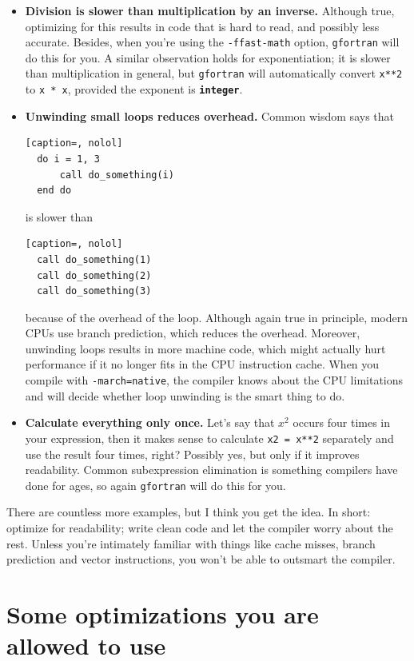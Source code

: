 \documentclass[openany,oneside]{report}
\newcommand{\keyword}[1]{\texttt{\bfseries\color{DarkRed}#1}}
\begin{document}
\begin{itemize}
  \item\textbf{Division is slower than multiplication by an inverse.} Although true, optimizing for this results in code that is hard to read, and possibly less accurate.
    Besides, when you're using the \texttt{-ffast-math} option, \texttt{gfortran} will do this for you.
    A similar observation holds for exponentiation; it is slower than multiplication in general, but \texttt{gfortran} will automatically convert \texttt{x**2} to \texttt{x * x}, provided the exponent is \keyword{integer}.
  \item\textbf{Unwinding small loops reduces overhead.} Common wisdom says that
\begin{lstlisting}[caption=, nolol]
  do i = 1, 3
      call do_something(i)
  end do
\end{lstlisting}
    is slower than
\begin{lstlisting}[caption=, nolol]
  call do_something(1)
  call do_something(2)
  call do_something(3)
\end{lstlisting}
    because of the overhead of the loop.
    Although again true in principle, modern CPUs use branch prediction, which reduces the overhead.
    Moreover, unwinding loops results in more machine code, which might actually hurt performance if it no longer fits in the CPU instruction cache.
    When you compile with \texttt{-march=native}, the compiler knows about the CPU limitations and will decide whether loop unwinding is the smart thing to do.
  \item\textbf{Calculate everything only once.} Let's say that $x^2$ occurs four times in your expression, then it makes sense to calculate \texttt{x2 = x**2} separately and use the result four times, right? Possibly yes, but only if it improves readability.
    Common subexpression elimination is something compilers have done for ages, so again \texttt{gfortran} will do this for you.
\end{itemize}
There are countless more examples, but I think you get the idea.
In short: optimize for readability; write clean code and let the compiler worry about the rest.
Unless you're intimately familiar with things like cache misses, branch prediction and vector instructions, you won't be able to outsmart the compiler.

\section{Some optimizations you are allowed to use}
\end{document}
